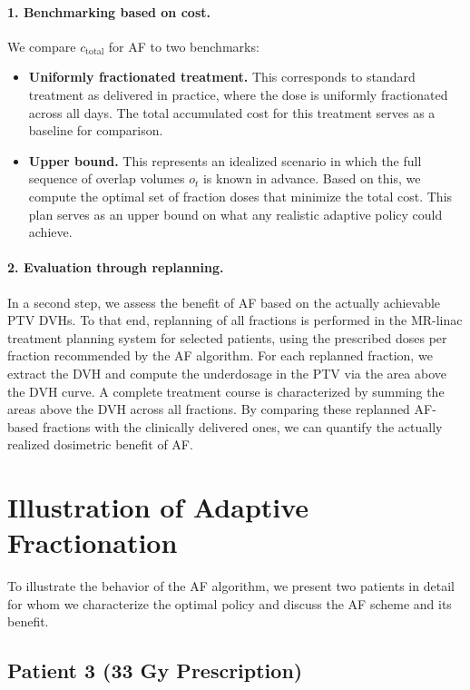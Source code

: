 \documentclass[11pt]{article}
\begin{document}
\paragraph{1. Benchmarking based on cost.}
We compare $c_{\mathrm{total}}$ for AF to two benchmarks:
\begin{itemize}
\item \textbf{Uniformly fractionated treatment.} This corresponds to standard treatment as delivered in practice, where the dose is uniformly fractionated across all days. The total accumulated cost for this treatment serves as a baseline for comparison.
\item \textbf{Upper bound.} This represents an idealized scenario in which the full sequence of overlap volumes $o_t$ is known in advance. Based on this, we compute the optimal set of fraction doses that minimize the total cost. This plan serves as an upper bound on what any realistic adaptive policy could achieve.
\end{itemize}

\paragraph{2. Evaluation through replanning.}
In a second step, we assess the benefit of AF based on the actually achievable PTV DVHs. To that end, replanning of all fractions is performed in the MR-linac treatment planning system for selected patients, using the prescribed doses per fraction recommended by the AF algorithm. For each replanned fraction, we extract the DVH and compute the underdosage in the PTV via the area above the DVH curve. A complete treatment course is characterized by summing the areas above the DVH across all fractions. By comparing these replanned AF-based fractions with the clinically delivered ones, we can quantify the actually realized dosimetric benefit of AF.

\section{Illustration of Adaptive Fractionation}

To illustrate the behavior of the AF algorithm, we present two patients in detail for whom we characterize the optimal policy and discuss the AF scheme and its benefit.

\subsection{Patient 3 (33 Gy Prescription)}
\end{document}
